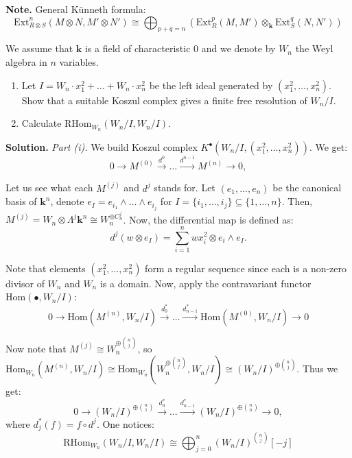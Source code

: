 \documentclass{category-template}
\begin{document}
\textbf{Note.} General Künneth formula:
\begin{equation*}
    \text{Ext}_{R \otimes S}^n(M \otimes N, M' \otimes N') \cong \bigoplus_{p+q=n}(\text{Ext}_R^p(M,M') \otimes_{\mathbf{k}} \text{Ext}_S^q(N, N'))
\end{equation*}

\begin{problem}
    We assume that $\mathbf{k}$ is a field of characteristic $0$ and we denote 
    by $W_n$ the Weyl algebra in $n$ variables.
    \begin{enumerate}
        \item[(i)] Let $I=W_n\cdot x_1^2+\dots+W_n \cdot x_n^2$ be the left
        ideal generated by $(x_1^2,\dots,x_n^2)$. Show that a suitable 
        Koszul complex gives a finite free resolution of $W_n/I$.
        \item[(ii)] Calculate $\text{RHom}_{W_n}(W_n/I, W_n/I)$.
    \end{enumerate}
\end{problem}

\textbf{Solution.} \textit{Part (i).} We build Koszul complex
$K^{\bullet}(W_n/I, (x_1^2,\dots,x_n^2))$. We get:
\begin{equation*}
    0 \to M^{(0)} \xrightarrow{d^0} \dots \xrightarrow{d^{n-1}} M^{(n)} \to 0,
\end{equation*}

Let us see what each $M^{(j)}$ and $d^j$ stands for. Let $(e_1,\dots,e_n)$ be
the canonical basis of $\mathbf{k}^n$, denote $e_I = e_{i_1} \wedge \dots \wedge
e_{i_j}$ for $I = \{i_1,\dots,i_j\} \subseteq \{1,\dots,n\}$. Then, $M^{(j)} =
W_n \otimes \Lambda^j \mathbf{k}^n \cong W_n^{\oplus C_n^j}$. Now,
the differential map is defined as:
\begin{equation*}
    d^j(w \otimes e_I) = \sum_{i=1}^n wx_i^2 \otimes e_i \wedge e_I.
\end{equation*}

Note that elements $(x_1^2,\dots,x_n^2)$ form a regular sequence since each is 
a non-zero divisor of $W_n$ and $W_n$ is a domain. Now, apply the 
contravariant functor $\text{Hom}(\bullet, W_n/I)$:
\begin{equation*}
    0 \to \text{Hom}(M^{(n)}, W_n/I) \xrightarrow{d_0^*} \dots \xrightarrow{d_{n-1}^*} \text{Hom}(M^{(0)}, W_n/I) \to 0
\end{equation*}

Now note that $M^{(j)} \cong W_n^{\oplus \binom{n}{j}}$, so $\text{Hom}_{W_n}(M^{(n)},
W_n/I) \cong \text{Hom}_{W_n}(W_n^{\oplus \binom{n}{j}}, W_n/I) \cong (W_n/I)^{\oplus
\binom{n}{j}}$. Thus we get:
\begin{equation*}
    0 \to (W_n/I)^{\oplus\binom{n}{1}} \xrightarrow{d_0^*} \dots \xrightarrow{d_{n-1}^*} (W_n/I)^{\oplus\binom{n}{n}} \to 0,
\end{equation*}
where $d_j^*(f) = f \circ d^j$. One notices:
\begin{equation*}
    \text{RHom}_{W_n}(W_n/I, W_n/I) \cong \bigoplus_{j=0}^n (W_n/I)^{\binom{n}{j}}[-j]
\end{equation*}
\end{document}
